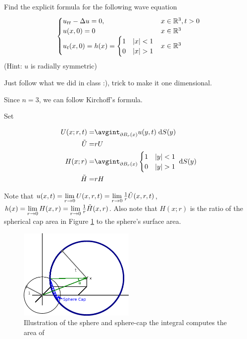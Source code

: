Find the explicit formula for the following wave equation
$$
\begin{cases}
  u_{tt} - \Delta u = 0, & x \in \mathbb{R}^3, t > 0\\
  u(x, 0) = 0 & x \in \mathbb{R}^3\\
  u_t(x, 0) = h(x) =
  \begin{cases}
    1 & |x| < 1\\
    0 & |x| > 1
  \end{cases} & x \in \mathbb{R}^3
\end{cases}
$$
(Hint: $u$ is radially symmetric)

Just follow what we did in class :), trick to make it one dimensional.

Since $n = 3$, we can follow Kirchoff's formula.

Set

\begin{align*}
  U(x; r, t) = &\avgint_{\bndry{\ball{x}{r}}} u(y, t) \dd{S(y)}\\
  \tilde{U} = &r U\\
  H(x; r) = &\avgint_{\bndry{\ball{x}{r}}}
    \begin{cases}
      1 & |y| < 1\\
      0 & |y| > 1
    \end{cases}
    \dd{S(y)}\\
  \tilde{H} = &r H\\
\end{align*}

Note that $u(x, t) = \lim \limits_{r \rightarrow 0} U(x, r, t) = \lim \limits_{r \rightarrow 0} \frac{1}{r} \tilde{U}(x, r, t)$,
$h(x) = \lim \limits_{r \rightarrow 0} H(x, r) = \lim \limits_{r \rightarrow 0} \frac{1}{r} \tilde{H}(x, r)$.
Also note that $H(x; r)$ is the ratio of the spherical cap area in Figure \ref{spherecap} to the sphere's surface area.
\begin{figure}[ht]
  \begin{center}
    \includegraphics[width=0.5\textwidth]{spherecap.png}
  \end{center}
  \caption{Illustration of the sphere and sphere-cap the integral computes the area of}
  \label{spherecap}
\end{figure}

